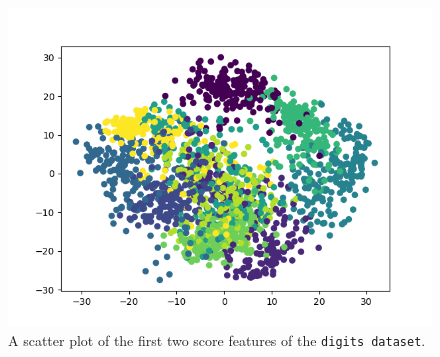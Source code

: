 \documentclass{article}
\newcommand{\R}{\mathbb{R}}
\newcommand{\norm}[1]{\Vert #1 \Vert}
\begin{document}
\begin{figure}
    \centering
    \includegraphics[width=.75\linewidth]{graphics/digits_clustering.png}
    \caption{A scatter plot of the first two score features of the \texttt{digits dataset}.}
    \label{fig:digits_cluster}
\end{figure}




\end{document}
